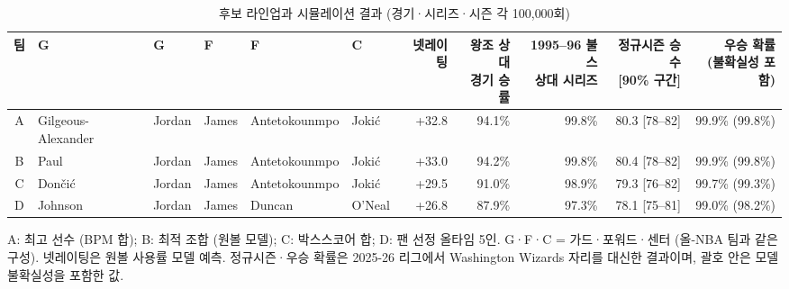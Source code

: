 \begin{table}[t]
\centering
\caption{후보 라인업과 시뮬레이션 결과 (경기·시리즈·시즌 각 100{,}000회)}
\label{tab:candidates}
\footnotesize
\setlength{\tabcolsep}{4pt}
\begin{tabular}{@{}clllllrrrrr@{}}
\toprule
팀 & G & G & F & F & C & 넷레이팅 & \shortstack{왕조 상대\\경기 승률} & \shortstack{1995--96 불스\\상대 시리즈} & \shortstack{정규시즌 승수\\{[}90\% 구간{]}} & \shortstack{우승 확률\\(불확실성 포함)} \\
\midrule
A & Gilgeous-Alexander & Jordan & James & Antetokounmpo & Jokić & +32.8 & 94.1\% & 99.8\% & 80.3 [78--82] & 99.9\% (99.8\%) \\
B & Paul & Jordan & James & Antetokounmpo & Jokić & +33.0 & 94.2\% & 99.8\% & 80.4 [78--82] & 99.9\% (99.8\%) \\
C & Dončić & Jordan & James & Antetokounmpo & Jokić & +29.5 & 91.0\% & 98.9\% & 79.3 [76--82] & 99.7\% (99.3\%) \\
D & Johnson & Jordan & James & Duncan & O'Neal & +26.8 & 87.9\% & 97.3\% & 78.1 [75--81] & 99.0\% (98.2\%) \\
\bottomrule
\end{tabular}

\vspace{2pt}
\parbox{0.95\textwidth}{\scriptsize A: 최고 선수 (BPM 합); B: 최적 조합 (원볼 모델); C: 박스스코어 합; D: 팬 선정 올타임 5인. G·F·C = 가드·포워드·센터 (올-NBA 팀과 같은 구성). 넷레이팅은 원볼 사용률 모델 예측. 정규시즌·우승 확률은 2025-26 리그에서 Washington Wizards 자리를 대신한 결과이며, 괄호 안은 모델 불확실성을 포함한 값.}
\end{table}
